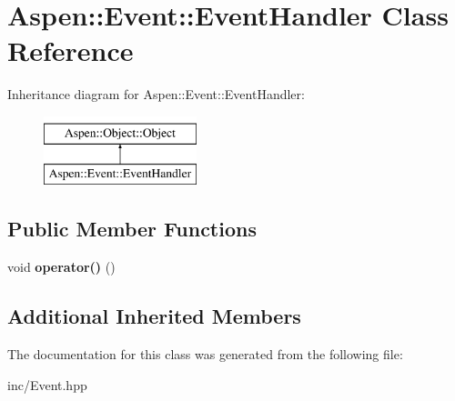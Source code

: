 \hypertarget{class_aspen_1_1_event_1_1_event_handler}{\section{Aspen\-:\-:Event\-:\-:Event\-Handler Class Reference}
\label{class_aspen_1_1_event_1_1_event_handler}
}
Inheritance diagram for Aspen\-:\-:Event\-:\-:Event\-Handler\-:\begin{figure}[H]
\begin{center}
\leavevmode
\includegraphics[height=2.000000cm]{de/da8/class_aspen_1_1_event_1_1_event_handler}
\end{center}
\end{figure}
\subsection*{Public Member Functions}
\begin{DoxyCompactItemize}
\item 
\hypertarget{class_aspen_1_1_event_1_1_event_handler_a5d13a2e6bcd952adc6961222627159f7}{void {\bfseries operator()} ()}\label{class_aspen_1_1_event_1_1_event_handler_a5d13a2e6bcd952adc6961222627159f7}

\end{DoxyCompactItemize}
\subsection*{Additional Inherited Members}


The documentation for this class was generated from the following file\-:\begin{DoxyCompactItemize}
\item 
inc/Event.\-hpp\end{DoxyCompactItemize}
